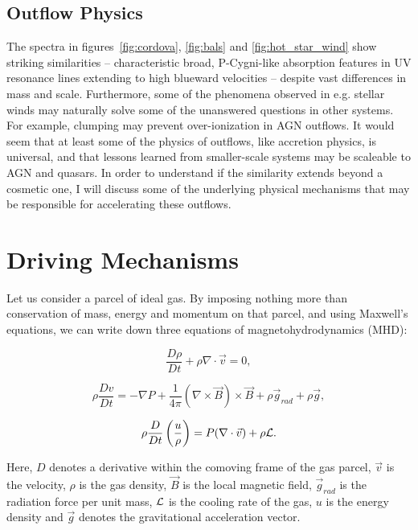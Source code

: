 \subsection{Outflow Physics}

The spectra in figures~\ref{fig:cordova}, \ref{fig:bals}
and \ref{fig:hot_star_wind} show striking similarities -- 
characteristic broad, P-Cygni-like absorption features in UV resonance
lines extending to high blueward velocities -- 
despite vast differences in mass and scale. 
Furthermore, some of the phenomena observed in e.g. stellar winds may 
naturally solve some of 
the unanswered questions in other systems. For example, clumping
may prevent over-ionization in AGN outflows. It would seem
that at least some of the physics of outflows, like accretion physics,
is universal, and that lessons learned from smaller-scale systems may be
scaleable to AGN and quasars. In order to understand if the similarity extends beyond
a cosmetic one, I will discuss some of the 
underlying physical mechanisms that may be responsible for accelerating
these outflows. 

\section{Driving Mechanisms}
Let us consider a parcel of ideal gas. By imposing nothing more than
conservation of mass, energy and momentum on that parcel, and using 
Maxwell's equations, we can write down 
three equations of magnetohydrodynamics (MHD): 

\begin{equation}
\label{eq:continuity}
\frac{D \rho}{Dt} + \rho \nabla \cdot \vec{v} = 0,
\end{equation}

\begin{equation}
\label{eq:motion}
\rho \frac{Dv}{Dt} = -\nabla P + \frac{1}{4 \pi}(\nabla \times \vec{B}) \times \vec{B} + \rho \vec{g}_{rad} + \rho \vec{g},
\end{equation}

\begin{equation}
\label{eq:energy}
\rho \frac{D}{Dt} \left(\frac{u}{\rho}\right) = P (\nabla \cdot \vec{v}) + \rho \cal{L}.
\end{equation}

Here, $D$ denotes a derivative within the comoving frame of the gas parcel, $\vec{v}$ is the velocity,
$\rho$ is the gas density, $\vec{B}$ is the local magnetic field, 
$\vec{g}_{rad}$ is the radiation
force per unit mass, $\cal{L}$ is the cooling rate of the gas, $u$ is the energy density 
and $\vec{g}$ denotes the gravitational acceleration vector.

